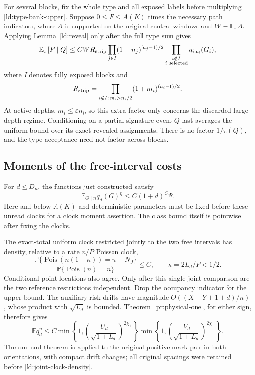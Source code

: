 For several blocks, fix the whole type and all exposed labels before
multiplying \eqref{ld:type-bank-upper}.  Suppose
\(0\le F\le A(K)\) times the necessary path indicators, where
\(A\) is supported on the original central windows and
\(W=\mathbb E_\pi A\).  Applying Lemma~\ref{ld:reveal} only after
the full type sum gives
\begin{equation}
 \mathbb E_\pi[F\mid Q]\le CW R_{\rm strip}
 \prod_{j\in I}(1+n_j)^{(a_j-1)/2}
 \prod_{\substack{i\notin I\\i\ {\rm selected}}}q_{i,d_i}(G_i),
 \label{ld:class-banks}
\end{equation}
where \(I\) denotes fully exposed blocks and
\[
 R_{\rm strip}=
 \prod_{i\notin I:\,m_i>n_i/2}(1+m_i)^{(a_i-1)/2}.
\]
At active depths, \(m_i\le\varepsilon n_i\), so this extra factor
only concerns the discarded large-depth regime.  Conditioning on a
partial-signature event \(Q\) last averages the uniform bound over
its exact revealed assignments.  There is no factor \(1/\pi(Q)\),
and the type acceptance need not factor across blocks.

\subsection{Moments of the free-interval costs}

For \(d\le D_n\), the functions just constructed satisfy
\begin{equation}
 \mathbb E_{G\mid n}q_d(G)^\eta\le C(1+d)^C\Psi.
 \label{ld:bank-moment}
\end{equation}
Here and below \(A(K)\) and deterministic parameters must be fixed
before these unread clocks for a clock moment assertion.  The class
bound itself is pointwise after fixing the clocks.

The exact-total uniform clock restricted jointly to the two free
intervals has density, relative to a rate \(n/P\) Poisson clock,
\begin{equation}
 \frac{\mathbb P\{\operatorname{Pois}(n(1-\kappa))=n-N_J\}}
 {\mathbb P\{\operatorname{Pois}(n)=n\}}\le C,
 \qquad \kappa=2L_d/P<1/2.
 \label{ld:joint-clock-density}
\end{equation}
Conditional point locations also agree.  Only after this single joint
comparison are the two reference restrictions independent.  Drop the
occupancy indicator for the upper bound.  The auxiliary risk drifts
have magnitude \(O((X+Y+1+d)/n)\), whose product with \(\sqrt{L_d}\)
is bounded.  Theorem~\ref{pr:physical-one}, for either sign,
therefore gives
\begin{equation}
 \mathbb E q_d^\eta\le C
 \min\left\{1,\left(\frac{U_d}{\sqrt{1+L_d}}\right)^{2\chi_+}\right\}
 \min\left\{1,\left(\frac{V_d}{\sqrt{1+L_d}}\right)^{2\chi_-}\right\}.
 \label{ld:two-one-ends}
\end{equation}
The one-end theorem is applied to the original positive mark pair in
both orientations, with compact drift changes; all original spacings
were retained before \eqref{ld:joint-clock-density}.

